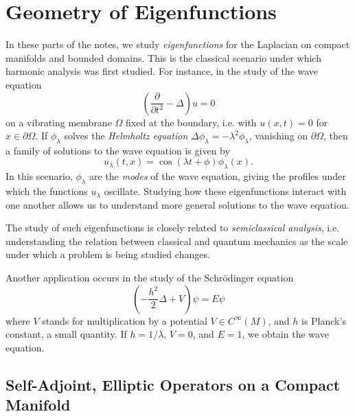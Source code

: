 
\part{Geometry of Eigenfunctions}



In these parts of the notes, we study \emph{eigenfunctions} for the Laplacian on compact manifolds and bounded domains. This is the classical scenario under which harmonic analysis was first studied. For instance, in the study of the wave equation
%
\[ \left( \frac{\partial}{\partial t^2} - \Delta \right) u = 0 \]
%
on a vibrating membrane $\Omega$ fixed at the boundary, i.e. with $u(x,t) = 0$ for $x \in \partial \Omega$. If $\phi_\lambda$ solves the \emph{Helmholtz equation} $\Delta \phi_\lambda = - \lambda^2 \phi_\lambda$, vanishing on $\partial \Omega$, then a family of solutions to the wave equation is given by
%
\[ u_\lambda(t,x) = \cos(\lambda t + \phi) \phi_\lambda(x). \]
%
In this scenario, $\phi_\lambda$ are the \emph{modes} of the wave equation, giving the profiles under which the functions $u_\lambda$ oscillate. Studying how these eigenfunctions interact with one another allows us to understand more general solutions to the wave equation.

The study of such eigenfunctions is closely related to \emph{semiclassical analysis}, i.e. understanding the relation between classical and quantum mechanics as the scale under which a problem is being studied changes.

Another application occurs in the study of the Schr\"{o}dinger equation
%
\[ \left( - \frac{h^2}{2} \Delta + V \right) \psi = E \psi \]
%
where $V$ stands for multiplication by a potential $V \in C^\infty(M)$, and $h$ is Planck's constant, a small quantity. If $h = 1/\lambda$, $V = 0$, and $E = 1$, we obtain the wave equation.








\chapter{Self-Adjoint, Elliptic Operators on a Compact Manifold}

